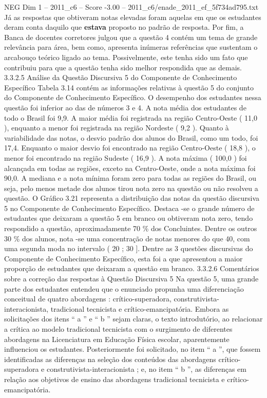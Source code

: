 \begin{textsample}{NEG Dim 1 – 2011\_c6 – Score -3.00 – 2011\_c6/enade\_2011\_ef\_5f734ad795.txt}
Já as respostas que obtiveram notas elevadas foram aquelas em que os estudantes deram conta daquilo que \textbf{estava} proposto no padrão de resposta.
Por fim, a Banca de docentes corretores julgou que a questão 4 contém um tema de grande relevância para área, bem como, apresenta inúmeras referências que sustentam o arcabouço teórico ligado ao tema.
Possivelmente, este tenha sido um fato que contribuiu para que a questão tenha sido melhor respondida que as demais. 3.3.2.5 Análise da Questão Discursiva 5 do Componente de Conhecimento Específico Tabela 3.14 contém as informações relativas à questão 5 do conjunto do Componente de Conhecimento Específico.
O desempenho dos estudantes nessa questão foi inferior ao das de números 3 e 4.
A nota média dos estudantes de todo o Brasil foi 9,9.
A maior média foi registrada na região Centro-Oeste ( 11,0 ), enquanto a menor foi registrada na região Nordeste ( 9,2 ).
Quanto à variabilidade das notas, o desvio padrão dos alunos do Brasil, como um todo, foi 17,4.
Enquanto o maior desvio foi encontrado na região Centro-Oeste ( 18,8 ), o menor foi encontrado na região Sudeste ( 16,9 ).
A nota máxima ( 100,0 ) foi alcançada em todas as regiões, exceto na Centro-Oeste, onde a nota máxima foi 90,0.
A mediana e a nota mínima foram zero para todas as regiões do Brasil, ou seja, pelo menos metade dos alunos tirou nota zero na questão ou não resolveu a questão.
O Gráfico 3.21 representa a distribuição das notas da questão discursiva 5 no Componente de Conhecimento Específico.
Destaca -se o grande número de estudantes que deixaram a questão 5 em branco ou obtiveram nota zero, tendo respondido a questão, aproximadamente 70 \% dos Concluintes.
Dentre os outros 30 \% dos alunos, nota -se uma concentração de notas menores do que 40, com uma segunda moda no intervalo ( 20 ; 30 ].
Dentre as 3 questões discursivas do Componente de Conhecimento Específico, esta foi a que apresentou a maior proporção de estudantes que deixaram a questão em branco. 3.3.2.6 Comentários sobre a correção das respostas à Questão Discursiva 5 Na questão 5, uma grande parte dos estudantes entendeu que o enunciado propunha uma diferenciação conceitual de quatro abordagens : crítico-superadora, construtivista-interacionista, tradicional tecnicista e crítico-emancipatória.
Embora as solicitações dos itens “ a ” e “ b ” sejam claras, o texto introdutório, ao relacionar a crítica ao modelo tradicional tecnicista com o surgimento de diferentes abordagens na Licenciatura em Educação Física escolar, aparentemente influenciou os estudantes.
Posteriormente foi solicitado, no item “ a ”, que fossem identificadas as diferenças na seleção dos conteúdos das abordagens crítico-superadora e construtivista-interacionista ; e, no item “ b ”, as diferenças em relação aos objetivos de ensino das abordagens tradicional tecnicista e crítico-emancipatória.

\end{textsample}
